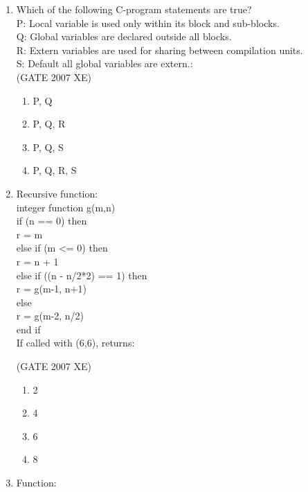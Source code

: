 \documentclass[journal,cmex10]{IEEEtran}
\theoremstyle{remark}
\numberwithin{equation}{enumi}
\numberwithin{figure}{enumi}
\begin{document}
\begin{enumerate}[label=\arabic*)]
    \item Which of the following C-program statements are true? \\
    P: Local variable is used only within its block and sub-blocks. \\
    Q: Global variables are declared outside all blocks. \\
    R: Extern variables are used for sharing between compilation units. \\
    S: Default all global variables are extern.:\\
    \hfill{(GATE 2007 XE)}
    \begin{multicols}{4}
    \begin{enumerate}
        \item P, Q
        \item P, Q, R
        \item P, Q, S
        \item P, Q, R, S
    \end{enumerate}
\end{multicols}

    \item Recursive function:\\

integer function g(m,n)\\
if (n == 0) then\\
   r = m\\
else if (m <= 0) then\\
   r = n + 1\\
else if ((n - n/2*2) == 1) then\\
   r = g(m-1, n+1)\\
else\\
   r = g(m-2, n/2)\\
end if\\

    If called with (6,6), returns:

   \hfill{(GATE 2007 XE)}
   \begin{multicols}{4}
    \begin{enumerate}
        \item 2
        \item 4
        \item 6
        \item 8
    \end{enumerate}
    \end{multicols}

    \item Function:\\


\end{enumerate}
\end{document}
